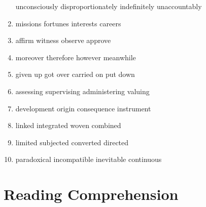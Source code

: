 \begin{enumerate}
\fourchoices
{unconsciously}
{disproportionately}
{indefinitely}
{unaccountably}




\item


\fourchoices
{missions}
{fortunes}
{interests}
{careers}




\item


\fourchoices
{affirm}
{witness}
{observe}
{approve}




\item


\fourchoices
{moreover}
{therefore}
{however}
{meanwhile}




\item


\fourchoices
{given up}
{got over}
{carried on}
{put down}




\item

\fourchoices
{assessing}
{supervising}
{administering}
{valuing}




\item

\fourchoices
{development}
{origin}
{consequence}
{instrument}



\item


\fourchoices
{linked}
{integrated}
{woven}
{combined}




\item


\fourchoices
{limited}
{subjected}
{converted}
{directed}




\item

\fourchoices
{paradoxical}
{incompatible}
{inevitable}
{continuous}


	
\end{enumerate}


\vfil

\section{Reading Comprehension}




